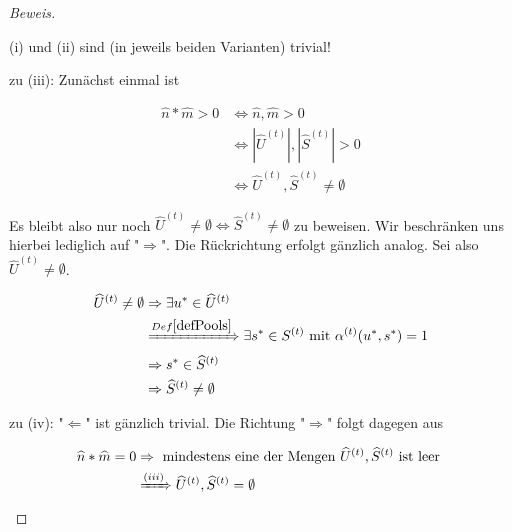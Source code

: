 \begin{proof}[Beweis] \textrm{ }

\vspace{0.3cm}

(i) und (ii) sind (in jeweils beiden Varianten) trivial!

\vspace{0.3cm}

zu (iii): Zunächst einmal ist

\begin{align*}
\widehat{n} * \widehat{m} > 0 &\Leftrightarrow \widehat{n}, \widehat{m} > 0 \\
&\Leftrightarrow |\widehat{U}^{(t)}|, |\widehat{S}^{(t)}| > 0 \\
&\Leftrightarrow \widehat{U}^{(t)}, \widehat{S}^{(t)} \neq \emptyset
\end{align*}

\vspace{0.3cm}

Es bleibt also nur noch $\widehat{U}^{(t)} \neq \emptyset \Leftrightarrow \widehat{S}^{(t)} \neq \emptyset$ zu beweisen. Wir beschränken uns hierbei lediglich auf "$\Rightarrow$". Die Rückrichtung erfolgt gänzlich analog. Sei also $\widehat{U}^{(t)} \neq \emptyset$.

\begin{align*}
\widehat{U}^{(t)} \neq \emptyset &\Rightarrow \exists u^{*} \in \widehat{U}^{(t)} \\
&\xRightarrow{Def \ref{defPools}} \exists s^{*} \in S^{(t)} \textrm{ mit } \alpha^{(t)}(u^{*}, s^{*}) = 1 \\
&\Rightarrow s^{*} \in \widehat{S}^{(t)} \\
&\Rightarrow \widehat{S}^{(t)} \neq \emptyset
\end{align*}

\vspace{0.3cm}

zu (iv): 
"$\Leftarrow$" ist gänzlich trivial. Die Richtung "$\Rightarrow$" folgt dagegen aus

\begin{align*}
\widehat{n} * \widehat{m} = 0 &\Rightarrow \textrm{ mindestens eine der Mengen } \widehat{U}^{(t)}, \widehat{S}^{(t)} \textrm{ ist leer } \\
&\xRightarrow{(iii)} \widehat{U}^{(t)}, \widehat{S}^{(t)} = \emptyset
\end{align*}

\vspace{0.3cm}


\end{proof}
